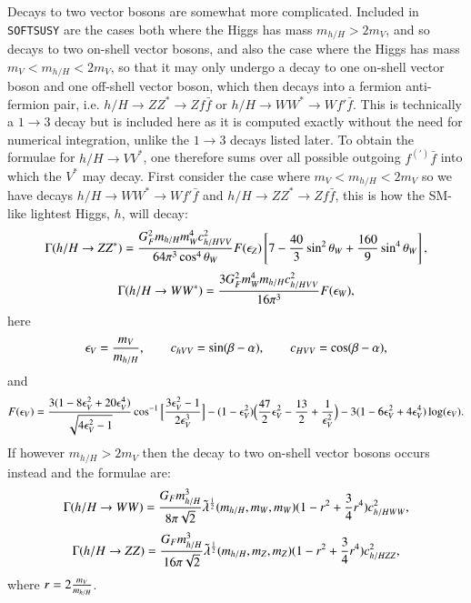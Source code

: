 \documentclass[final,3p,times]{elsarticle}
\begin{document}
Decays to two vector bosons are somewhat more complicated. Included in {\tt {\tt SOFTSUSY}} are the cases both where the Higgs has mass $m_{h/H} > 2m_V $, and so decays to two on-shell vector bosons, and also the case where the Higgs has mass $m_V < m_{h/H} < 2m_V$, so that it may only undergo a decay to one on-shell vector boson and one off-shell vector boson, which then decays into a fermion anti-fermion pair, i.e. $h/H \rightarrow ZZ^* \rightarrow Zf\bar{f}$ or $h/H \rightarrow WW^* \rightarrow Wf'\bar{f}$. This is technically a $1 \rightarrow 3$ decay but is included here as it is computed exactly without the need for numerical integration, unlike the $1 \rightarrow 3$ decays listed later. To obtain the formulae for $h/H \rightarrow VV^*$, one therefore sums over all possible outgoing $f^{(')}\bar{f}$ into which the $V^*$ may decay.
First consider the case where $m_V < m_{h/H} < 2m_V$ so we have decays $h/H \rightarrow WW^* \rightarrow Wf'\bar{f}$ and $h/H \rightarrow ZZ^* \rightarrow Zf\bar{f}$, this is how the SM-like lightest Higgs, $h$, will decay:
\begin{equation} \label{hZZstar}
\Gamma(h/H \rightarrow ZZ^*) = {G_{F}^2 m_{h/H} m_{W}^4 c_{h/HVV}^2 \over 64 \pi^3 \cos^4 \theta_W} F(\epsilon_{Z}) \left[7 - {40 \over 3} \sin^2 \theta_W + {160 \over 9} \sin^4 \theta_W\right],
\end{equation} 
\begin{equation} \label{hWWstar}
\Gamma(h/H \rightarrow WW^*) = {3 G_{F}^2 m_{W}^4 m_{h/H} c_{h/HVV}^2 \over 16 \pi^3}  F(\epsilon_{W}) ,
\end{equation} 
here
\begin{equation}
\epsilon_{V} = {m_V \over m_{h/H}}, \quad \quad c_{hVV} = \sin(\beta-\alpha), \quad \quad c_{HVV} = \cos(\beta-\alpha),
\end{equation}
and 
\begin{equation}
\begin{aligned}
F(\epsilon_{V}) = {3(1-8\epsilon_{V}^2 + 20\epsilon_{V}^4) \over \sqrt{4\epsilon_{V}^2-1}}\cos^{-1}\Big[{3\epsilon_{V}^2-1 \over 2\epsilon_{V}^3}\Big] - (1-\epsilon_{V}^2)\Big({47 \over 2}\epsilon_{V}^2 -{13 \over 2} + {1 \over \epsilon_{V}^2}\Big) - 3(1-6\epsilon_{V}^2+4\epsilon_{V}^4)\log(\epsilon_{V}).
\end{aligned}
\end{equation}
If however $m_{h/H} > 2m_{V}$ then the decay to two on-shell vector bosons occurs instead and the formulae are:
\begin{equation} \label{hWW}
\Gamma(h/H \rightarrow WW) = {G_{F} m_{h/H}^3 \over 8\pi \sqrt{2}} \tilde{\lambda}^{1 \over 2}(m_{h/H},m_{W},m_{W})(1-r^2 + {3 \over 4}r^4)c_{h/HWW}^2,
\end{equation}
\begin{equation} \label{hZZ}
\Gamma(h/H \rightarrow ZZ) = {G_{F} m_{h/H}^3 \over 16\pi \sqrt{2}} \tilde{\lambda}^{1 \over 2}(m_{h/H},m_{Z},m_{Z})(1-r^2 + {3 \over 4}r^4)c_{h/HZZ}^2,
\end{equation}
where $r = 2{m_{V} \over m_{h/H}}$.
\end{document}
